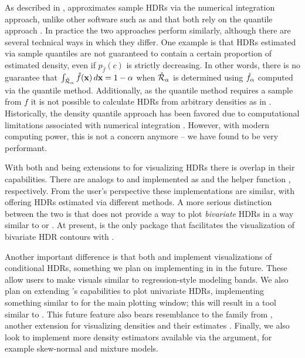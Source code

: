 As described in ,  approximates sample HDRs via the numerical integration approach,
unlike other software such as  and  that both rely on the quantile approach \citep{hyndman_computing_1996}.
In practice the two approaches perform similarly, although there are several technical ways in which they differ.
One example is that HDRs estimated via sample quantiles are not guaranteed to contain a certain proportion of estimated density,
even if $p_{\hat{f}}(c)$ is strictly decreasing.
In other words, there is no guarantee that $\int_{\hat{\mathcal{R}}_{\alpha}}\hat{f}(\textbf{x})\,d\textbf{x} = 1 - \alpha$ when $\hat{\mathcal{R}}_{\alpha}$ is determined using $\hat{f}_{\alpha}$ computed via the quantile method.
Additionally, as the quantile method requires a sample from $f$ it is not possible to calculate HDRs from arbitrary densities as in .
Historically, the density quantile approach has been favored due to computational limitations associated with numerical integration \citep{hyndman_computing_1996}.
However, with modern computing power, this is not a concern anymore -- we have found  to be very performant.

With both  and  being extensions to  for visualizing HDRs there is overlap in their capabilities.
There are analogs to  and  implemented as  and the helper function , respectively.
From the user's perspective these implementations are similar, with  offering HDRs estimated via different methods.
A more serious distinction between the two is that  does not provide a way to plot \emph{bivariate} HDRs in a way similar to  or .
At present,  is the only package that facilitates the visualization of bivariate HDR contours with .

Another important difference is that both  and  implement visualizations of conditional HDRs, something we plan on implementing in  in the future.
These allow users to make visuals similar to regression-style modeling bands.
We also plan on extending 's capabilities to plot univariate HDRs, implementing something similar to  for the main plotting window; this will result in a tool similar to .
This future feature also bears resemblance to the  family from ,
another  extension for visualizing densities and their estimates \citep{ggdist}.
Finally, we also look to implement more density estimators available via the  argument,
for example skew-normal and mixture models.

